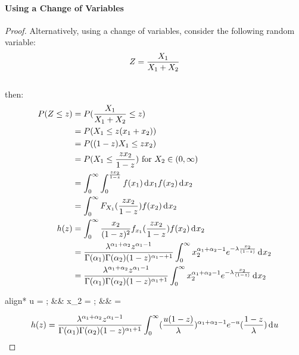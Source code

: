 \documentclass[12pt]{article}
\begin{document}
\paragraph{Using a Change of Variables}
\begin{proof}
	Alternatively, using a change of variables, consider the following random variable:\vspace*{-12pt}
	\begin{equation}
		Z = \frac{X_1}{X_1+X_2}\\
	\end{equation}\\[-38pt]
	then:\vspace*{-12pt}
	\begin{equation}
		\begin{split}
			P(Z\le z)	&=	P(\frac{X_1}{X_1+X_2}\le z)\\
						&=	P(X_1\le z (x_1+ x_2))\\
						&=	P((1-z)X_1\le zx_2)\\
						&=	P(X_1\le {\frac{zx_2}{1-z}}) \text{ for } X_2 \in (0,\infty)\\
						&=	\int_{0}^{\infty}\int_{0}^{\frac{zx_2}{1-z}} f(x_1)\mathop{}\!\mathrm{d^{}}x_1 f(x_2)\mathop{}\!\mathrm{d^{}}x_2\\
						&=	\int_{0}^{\infty}F_{X_1}(\frac{z x_2}{1-z})f(x_2)\mathop{}\!\mathrm{d^{}}x_2\\
			h(z)		&=	\int_{0}^{\infty}\frac{x_2}{(1-z)^2}f_{x_1}(\frac{zx_2}{1-z})f(x_2)\mathop{}\!\mathrm{d^{}}x_2\\
						&=	\frac{\lambda^{\alpha_1+\alpha_2} z^{\alpha_1 - 1}}{\Gamma (\alpha _1) \Gamma (\alpha _2) (1-z)^{\alpha_1 -+1}} \int_{0}^{\infty} x_2^{\alpha_1 + \alpha_2 - 1} e^{-\lambda \frac{x_2}{(1-z)}}\mathop{}\!\mathrm{d^{}}x_2\\
						&=	\frac{\lambda^{\alpha_1+\alpha_2} z^{\alpha_1 - 1}}{\Gamma (\alpha _1) \Gamma (\alpha _2) (1-z)^{\alpha_1 +1}} \int_{0}^{\infty} x_2^{\alpha_1 + \alpha_2 - 1} e^{-\lambda \frac{x_2}{(1-z)}}\mathop{}\!\mathrm{d^{}}x_2\\
		\end{split}
	\end{equation}
	\begin{empheq}[box=\widefbox]{align*}
		u = ;	&&	x_2 = ;	&&	 = 
	\end{empheq}
	\begin{equation}
		\begin{split}
			h(z)	&=	\frac{\lambda^{\alpha_1+\alpha_2} z^{\alpha_1 - 1}}{\Gamma (\alpha _1) \Gamma (\alpha _2) (1-z)^{\alpha_1 +1}} \int_{0}^{\infty} (\frac{u (1-z)}{\lambda})^{\alpha_1 + \alpha_2 -1} e^{-u} (\frac{1-z}{\lambda})\diff{u}\\

\end{split}
\end{equation}
\end{proof}
\end{document}

